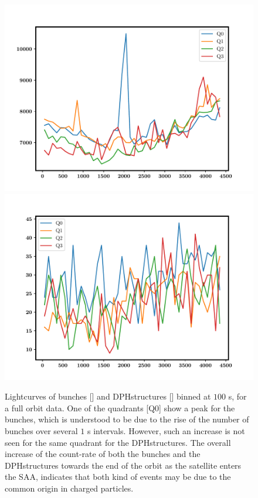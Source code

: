 \begin{figure}
\begin{center}
\includegraphics[scale=0.42]{LC_of_bunches}
\includegraphics[scale=0.42]{LC_of_DPHstructures}
\caption[Lightcurves of bunches and DPHstructures for a full orbit data]{Lightcurves of bunches [\eL] and DPHstructures [\eR] binned at $ 100$ s, for a full orbit data. One of the quadrants [Q0] show a peak for the bunches, which is understood to be due to the rise of the number of bunches over several $1$ s intervals. However, such an increase is not seen for the same quadrant for the DPHstructures. The overall increase of the count-rate of both the bunches and the DPHstructures towards the end of the orbit as the satellite enters the SAA, indicates that both kind of events may be due to the common origin in charged particles.}
\label{fig:lightcurve_comparison_of_bunches_and_DPHstructures}
\end{center}
\end{figure}

